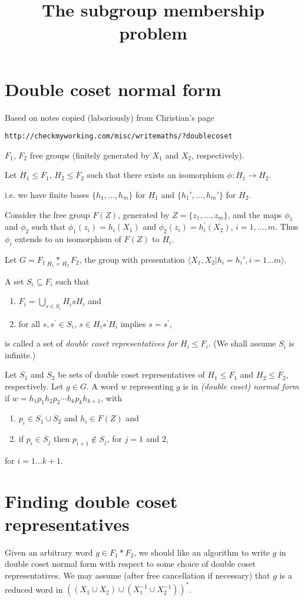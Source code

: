 \documentclass[a4paper,12pt]{article}
\title{The subgroup membership problem
}
\author{ 
}
\numberwithin{equation}{section}
\numberwithin{figure}{section}
\newcommand{\la}{\langle}
\newcommand{\ra}{\rangle}
\newcommand{\be}{\begin{enumerate}}
\newcommand{\ee}{\end{enumerate}}
\begin{document}
\maketitle
\section{Double coset normal form}
Based on notes copied (laboriously) from Christian's page 
\begin{verbatim}
http://checkmyworking.com/misc/writemaths/?doublecoset
\end{verbatim}
$F_1$, $F_2$ free groups (finitely generated by $X_1$ 
and $X_2$, respectively).

Let $H_1 \leq F_1$, $H_2 \leq F_2$ such that 
there exists an isomorphism $\phi: H_1 \rightarrow H_2$.

i.e. we have finite bases $\{h_1, \ldots, h_m \}$  for $H_1$ and 
$\{h_1', \ldots, h_m'\}$ for $H_2$.

Consider the free group $F(Z)$, generated by $Z=\{z_1, \ldots, z_m\}$, 
and the maps $\phi_1$ and $\phi_2$ such that 
$\phi_1(z_i)=h_i(X_1)  $ and  $\phi_2(z_i)=h^\prime_i(X_2)$, $i=1,\ldots ,m$.
Thus $\phi_i$ extends to an isomorphism of $F(Z)$ to $H_i$. 

Let ${G = F_1 \underset{H_1=H_2}{\ast} F_2}$, the group with  
 presentation $\la X_1,X_2 | h_i = h_i', i=1 \ldots m\ra$.

A  set $S_i \subseteq F_i$ such that
\be 
\item
$F_i = \displaystyle{\bigcup_{s \in S_i} H_isH_i}$ 
and 
\item
for all $s, s^\prime \in S_i$, $s\in H_i s^\prime H_i$ 
implies $s=s^\prime$,
\ee
is called a set of \emph{double coset representatives for} $H_i\le F_i$. 
(We shall assume $S_i$ is infinite.) 

Let $S_1$ and $S_2$ be sets of  double coset representatives of 
$H_1\le F_1$ and $H_2\le F_2$, respectively. Let $g \in G$. 
A word $w$ representing $g$ is in \emph{(double coset) normal form} if 
$w = h_{1}p_1h_{2}p_2 \cdots h_{k}p_kh_{{k+1}}$, with
\be
\item $p_i \in S_1\cup S_2$  and $h_i \in F(Z)$ and
\item if $p_i\in S_j$ then $p_{i+1}\notin S_j$, for $j=1$ and $2$,
\ee
for $i = 1 \ldots k+1$.
\section{Finding double coset representatives}
\begin{comment}
Suppose $g = g_1g_2 \cdots g_k$, where $g_i$ is in a factor $F_1$ or 
$F_2$: that is (after free cancellation if necessary) $g_i$ is a 
reduced word in $(X_1\cup X_1^{-1})^\ast$ or $(X_2\cup X_2^{-1})^\ast$
\end{comment}
Given an arbitrary word $g\in F_1\ast F_2$,  
we should like an algorithm to write $g$ in double coset normal form
with respect to some choice of double coset representatives. We may 
assume (after free cancellation if necessary) that $g$ is a 
reduced word in $((X_1\cup X_2)\cup ( X_1^{-1}\cup X_2^{-1}))^\ast$.
 
\end{document}
